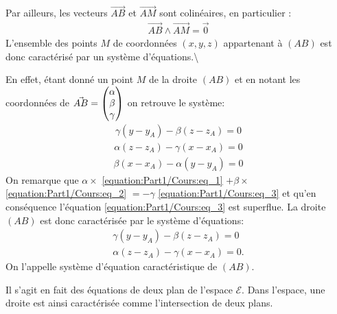 \documentclass[letterpaper,10pt,english]{jupyterBook}
\begin{document}
\sphinxAtStartPar
Par ailleurs, les vecteurs \(\vec{AB}\) et \(\vec{AM}\) sont colinéaires, en particulier :
\begin{equation*}
\begin{split}
\vec{AB} \wedge \vec{AM} = \vec{0}
\end{split}
\end{equation*}
\sphinxAtStartPar
L’ensemble des points \(M\) de coordonnées \((x,y,z)\) appartenant à \((AB)\) est donc caractérisé par un système d’équations.\textbackslash{}

\sphinxAtStartPar
En effet, étant donné un point \(M\) de la droite \((AB)\) et en notant les coordonnées de \(\vec{AB} = \begin{pmatrix}\alpha\cr \beta \cr \gamma \end{pmatrix}\) on retrouve le système:
\begin{equation}\label{equation:Part1/Cours:eq_1}
\begin{split}\gamma(y-y_A) - \beta(z-z_A) = 0 \end{split}
\end{equation}\begin{equation}\label{equation:Part1/Cours:eq_2}
\begin{split}
\alpha(z-z_A)-\gamma(x-x_A)=0 
\end{split}
\end{equation}\begin{equation}\label{equation:Part1/Cours:eq_3}
\begin{split}
\beta(x-x_A) - \alpha (y-y_A)=0 
\end{split}
\end{equation}
\sphinxAtStartPar
On remarque que \(\alpha \times\) \eqref{equation:Part1/Cours:eq_1} \(+ \beta \times \) \eqref{equation:Part1/Cours:eq_2}  \(=-\gamma \) \eqref{equation:Part1/Cours:eq_3} et qu’en conséquence l’équation \eqref{equation:Part1/Cours:eq_3} est superflue. La droite \((AB)\) est donc caractérisée par le système d’équations:
\begin{equation*}
\begin{split}
\gamma(y-y_A) - \beta(z-z_A) = 0\\
\alpha(z-z_A)-\gamma(x-x_A)=0.
\end{split}
\end{equation*}
\sphinxAtStartPar
On l’appelle système d’équation caractéristique de \((AB)\).

\sphinxAtStartPar
{} Il s’agit en fait des équations de deux plan de l’espace \(\mathcal{E}\). Dans l’espace, une droite est ainsi caractérisée comme l’intersection de deux plans.
\end{document}

